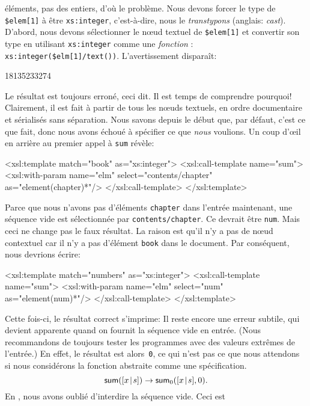 éléments, pas des entiers, d'où le problème. Nous devons forcer le
type de \texttt{\$elem[1]} à être \texttt{xs:integer}, c'est-à-dire,
nous le \emph{transtypons} (anglais: \emph{cast}). D'abord, nous
devons sélectionner le nœud textuel de \texttt{\$elem[1]} et
convertir son type en utilisant \texttt{xs:integer} comme une
\emph{fonction} \XPath:
\texttt{xs:integer(\$elm[1]/text()\!)}. L'avertissement disparaît:
\begin{sverb}
18135233274
\end{sverb}
Le résultat est toujours erroné, ceci dit. Il est temps de comprendre
pourquoi! Clairement, il est fait à partir de tous les nœuds
textuels, en ordre documentaire et sérialisés sans séparation. Nous
savons depuis le début que, par défaut, c'est ce que \XSLT fait, donc
nous avons échoué à spécifier ce que \emph{nous} voulions. Un coup
d'œil en arrière au premier appel à \texttt{sum} révèle:
\begin{sverb}
  <xsl:template match="book" as="xs:integer">
    <xsl:call-template name="sum">
      <xsl:with-param name="elm" select="contents/chapter"
                                 as="element(chapter)*"/>
    </xsl:call-template>
  </xsl:template>
\end{sverb}
Parce que nous n'avons pas d'éléments \texttt{chapter} dans l'entrée
maintenant, une séquence vide est sélectionnée par
\texttt{contents/chapter}. Ce devrait être \texttt{num}. Mais ceci ne
change pas le faux résultat. La raison est qu'il n'y a pas de nœud
contextuel car il n'y a pas d'élément \texttt{book} dans le
document. Par conséquent, nous devrions écrire:
\begin{sverb}
  <xsl:template match="numbers" as="xs:integer">
    <xsl:call-template name="sum">
      <xsl:with-param name="elm" select="num"
                                 as="element(num)*"/>
    </xsl:call-template>
  </xsl:template>
\end{sverb}
Cette fois-ci, le résultat correct s'imprime:
\noindent Il reste encore une erreur subtile, qui devient apparente
quand on fournit la séquence vide en entrée. (Nous recommandons de
toujours tester les programmes avec des valeurs extrêmes de l'entrée.)
En effet, le résultat est alors~\texttt{0}, ce qui n'est pas ce que
nous attendons si nous considérons la fonction abstraite 
comme une spécification.
\begin{equation*}
\textsf{sum}([{x}\!\mid\!{s}]) \rightarrow \textsf{sum}_0([{x}\!\mid\!{s}],0).
\end{equation*}
En \XSLT, nous avons oublié d'interdire la séquence vide. Ceci est
